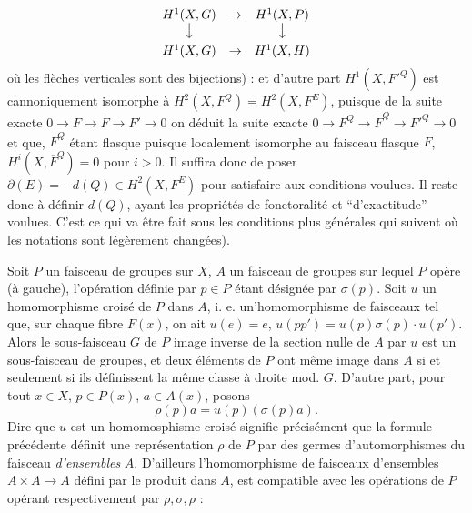 
\[
\begin{array}{ccc}
H^1(X,G)&\to&H^1(X,P)\\
\big\downarrow&&\big\downarrow\\[0.45em]
H^1(X,G)&\to&H^1(X,H)
\end{array}
\]
où les flèches verticales sont des bijections) : et d'autre part
$H^1(X,{F'}^Q)$ est cannoniquement isomorphe à
$H^2(X,F^Q)=H^2(X,F^E)$, puisque de la suite exacte
$0\to F\to\overline F\to F'\to0$
on déduit la suite exacte
$0\to F^Q\to\overline F^Q\to {F'}^Q\to0$
et que, $\overline F^Q$ étant flasque puisque localement isomorphe au faisceau
flasque $\overline F$, $H^i(X,\overline F^Q)=0$ pour $i>0$.
Il suffira donc de poser
$\partial(E)=-d(Q)\in H^2(X,F^E)$
pour satisfaire aux conditions voulues. Il reste donc à définir $d(Q)$, ayant
les propriétés de fonctoralité et ``d'exactitude'' voulues. C'est ce qui
va être fait sous les conditions plus générales qui suivent où les notations
sont légèrement changées).

Soit $P$ un faisceau de groupes sur $X$, $A$ un faisceau de groupes sur lequel
$P$ opère (à gauche), l'opération définie par $p\in P$ étant désignée par
$\sigma(p)$. Soit $u$ un homomorphisme croisé de $P$ dans $A$, i. e.
un'homomorphisme de faisceaux tel que, sur chaque fibre $F(x)$, on ait
$u(e)=e$, $u(pp')=u(p)\sigma(p)\mathbin{\cdot}u(p')$. Alors le sous-faisceau
$G$ de $P$ image inverse de la section nulle de $A$ par $u$ est un
sous-faisceau de groupes, et deux éléments de $P$ ont même image dans $A$ si
et seulement si ils définissent la même classe à droite mod. $G$.
D'autre part, pour tout $x\in X$, $p\in P(x)$, $a\in A(x)$, posons
\[
\rho(p)a=u(p)(\sigma(p)a).
\]
Dire que $u$ est un homomosphisme croisé signifie précisément que la formule
précédente définit une représentation $\rho$ de $P$ par des germes
d'automorphismes du faisceau \textit{d'ensembles} $A$. D'ailleurs
l'homomorphisme de faisceaux d'ensembles
$A\times A\to A$ défini par le produit dans $A$, est compatible
avec les opérations de $P$ opérant respectivement par $\rho,\sigma,\rho$ :

